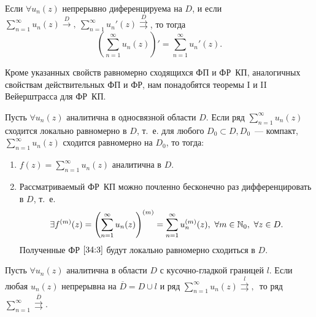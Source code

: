 \documentclass[../../main.tex]{subfiles}
\begin{document}
\begin{thm}[о дифференцировании ФР~КП]
Если $ \forall u_n(z) $ непрерывно диференцируема на $ D $, и если $ 
\sum\limits_{n = 1}^{\infty} u_n(z) \overset{D}{\longrightarrow},\  
\sum\limits_{n = 1}^{\infty} u_n'(z) \overset{D}\rightrightarrows $, то 
тогда
\[\left(\sum\limits_{n = 1}^{\infty} u_n(z)\right)' = \sum\limits_{n = 1}^{\infty} 
u_n'(z).\]
\end{thm}

Кроме указанных свойств равномерно сходящихся ФП и ФР~КП, аналогичных свойствам 
действительных ФП и ФР, нам понадобятся теоремы I и II Вейерштрасса для ФР~КП.

\begin{thm}
	Пусть $ \forall u_n(z) $ аналитична в односвязной области $ D $. Если ряд $ 
	\sum\limits_{n = 1}^{\infty} u_n(z) $ сходится локально равномерно в $ D $, 
	т.~е. для любого $ {D_0 \subset D}, D_0 $~--- компакт, $ \sum\limits_{n = 
	1}^{\infty} u_n(z) $ сходится равномерно на $ D_0 $, то тогда:
	\begin{enumerate}
		\item  $ f(z) = \sum\limits_{n = 1}^{\infty} u_n(z) $ аналитична в 
		$ D $.
		\item Рассматриваемый ФР~КП можно почленно бесконечно раз дифференцировать в 
		$ D $, т.~е.
		\begin{equation}\label{34:3}
			 \exists f^{(m)}(z) = \left(\sum\limits_{n = 1}^{\infty} u_n(z)\right)^{(m)} = 
			 \sum\limits_{n = 1}^{\infty} u_n^{(m)} (z), \ \forall m \in \N_0,\ 
			 \forall z \in D.
		\end{equation}
		Полученные ФР $ \eqref{34:3} $ будут локально равномерно сходиться в $ D $.
	\end{enumerate}
\end{thm}

\begin{thm}
	Пусть $ \forall u_n(z) $ аналитична в области $ D $ с кусочно-гладкой 
	границей $ l $. Если любая $ u_n(z) $ непрерывна на $ \overline{D} = D \cup 
	l $ и ряд $ \sum\limits_{n = 1}^{\infty} u_n(z) 
	\overset{l}\rightrightarrows,\, $ то ряд $ \sum\limits_{n = 1}^{\infty} 
	\overset{\overline{D}}\rightrightarrows $.
\end{thm}
\end{document}
